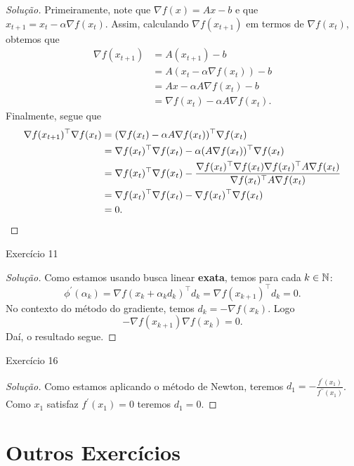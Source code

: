\documentclass[12pt,twoside,a4paper]{article}
\begin{document}
\begin{proof}[Solução]
 Primeiramente, note que \(\nabla f(x)=Ax-b\) e que \(x_{t+1}=x_t-\alpha\nabla
 f(x_t)\). Assim, calculando \(\nabla f(x_{t+1})\) em termos de \(\nabla
 f(x_t)\), obtemos que
 \begin{align*}
   \nabla f(x_{t+1})&= A(x_{t+1}) -b\\&
   = A(x_t-\alpha\nabla f(x_t))-b\\&
   = Ax -\alpha A\nabla f(x_t) -b \\&
   = \nabla f(x_t) - \alpha A\nabla f(x_t).
 \end{align*}
 Finalmente, segue que
 \begin{align*}
   \nabla f(x_{t+1})^\top\nabla f(x_t)&
                                        = (\nabla f(x_t) - \alpha A\nabla f(x_t))^\top\nabla f(x_t)\\&
   = \nabla f(x_t)^\top\nabla f(x_t) -\alpha (A\nabla f(x_t))^\top\nabla f(x_t) \\&=\nabla f(x_t)^\top\nabla f(x_t) - \frac{\nabla f(x_t)^\top\nabla f(x_t)\nabla f(x_t)^\top A\nabla f(x_t)}{\nabla f(x_t)^\top A\nabla f(x_t)}\\&= \nabla f(x_t)^\top\nabla f(x_t) - \nabla f(x_t)^\top\nabla f(x_t) \\&= 0.\qedhere
  \end{align*}
\end{proof}

\begin{problema}
Exercício 11  
\end{problema}
\begin{proof}[Solução]
 Como estamos usando busca linear \textbf{exata}, temos para cada
 \(k\in\mathbb{N}\):
 \[\phi^\prime(\alpha_k)=\nabla f(x_k+\alpha_kd_k)^\top d_k=\nabla f(x_{k+1})^\top d_k=0.\]
 No contexto do método do gradiente, temos \(d_k=-\nabla f(x_k)\). Logo
 \[-\nabla f(x_{k+1})\nabla f(x_k)=0.\]
 Daí, o resultado segue.\qedhere
\end{proof}

\begin{problema}
Exercício 16    
\end{problema}
\begin{proof}[Solução]
Como estamos aplicando o método de Newton, teremos
\(d_1=-\frac{f^\prime(x_1)}{f^{\prime\prime}(x_1)}\). Como \(x_1\) satisfaz
 \(f^\prime(x_1)=0\) teremos \(d_1=0\).
\end{proof}
  
\section{Outros Exercícios}
\end{document}
